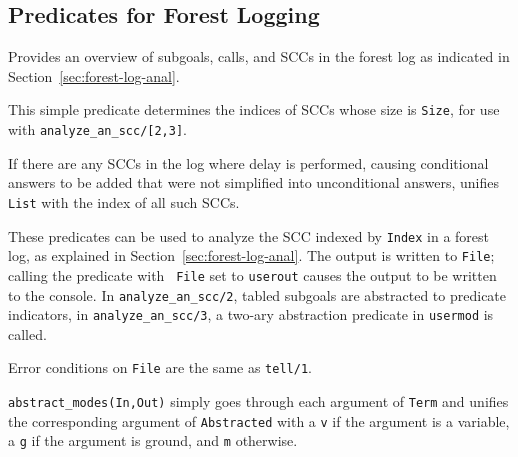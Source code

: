 \subsection{Predicates for Forest Logging}

\begin{description}
%
Provides an overview of subgoals, calls, and SCCs in the forest log as
indicated in Section~\ref{sec:forest-log-anal}.

%
This simple predicate determines the indices of SCCs whose size is
{\tt Size}, for use with {\tt analyze\_an\_scc/[2,3]}.

%
If there are any SCCs in the log where delay is performed, causing
conditional answers to be added that were not simplified into
unconditional answers, unifies {\tt List} with the index of all such
SCCs.

%
These predicates can be used to analyze the SCC indexed by {\tt Index}
in a forest log, as explained in Section~\ref{sec:forest-log-anal}.
The output is written to {\tt File}; calling the predicate with {\tt
  File} set to {\tt userout} causes the output to be written to the
console.  In {\tt analyze\_an\_scc/2}, tabled subgoals are abstracted
to predicate indicators, in {\tt analyze\_an\_scc/3}, a two-ary
abstraction predicate in {\tt usermod} is called.

Error conditions on {\tt File} are the same as {\tt tell/1}.

%
{\tt abstract\_modes(In,Out)} simply goes through each argument of
{\tt Term} and unifies the corresponding argument of {\tt Abstracted}
with a {\tt v} if the argument is a variable, a {\tt g} if the
argument is ground, and {\tt m} otherwise.

\end{description}


